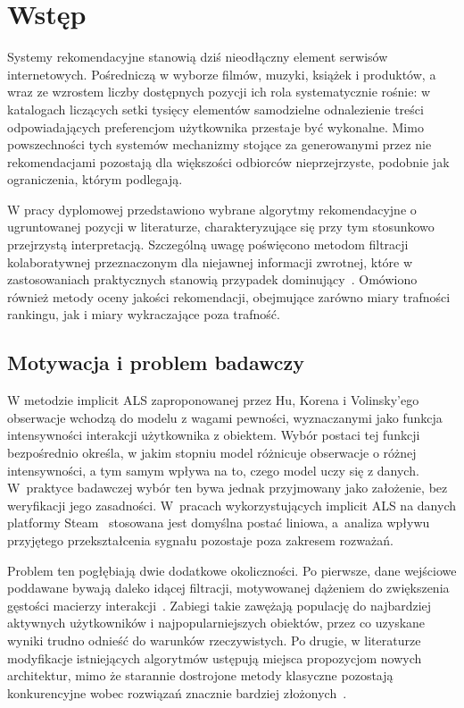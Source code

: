 \chapter{Wstęp}

Systemy rekomendacyjne stanowią dziś nieodłączny element serwisów internetowych. Pośredniczą w wyborze filmów, muzyki, książek i produktów, a wraz ze wzrostem liczby dostępnych pozycji ich rola systematycznie rośnie: w katalogach liczących setki tysięcy elementów samodzielne odnalezienie treści odpowiadających preferencjom użytkownika przestaje być wykonalne. Mimo powszechności tych systemów mechanizmy stojące za generowanymi przez nie rekomendacjami pozostają dla większości odbiorców nieprzejrzyste, podobnie jak ograniczenia, którym podlegają.

W pracy dyplomowej przedstawiono wybrane algorytmy rekomendacyjne o ugruntowanej pozycji w literaturze, charakteryzujące się przy tym stosunkowo przejrzystą interpretacją. Szczególną uwagę poświęcono metodom filtracji kolaboratywnej przeznaczonym dla niejawnej informacji zwrotnej, które w zastosowaniach praktycznych stanowią przypadek dominujący~\cite{aggarwal2016recommender}. Omówiono również metody oceny jakości rekomendacji, obejmujące zarówno miary trafności rankingu, jak i miary wykraczające poza trafność.

\section{Motywacja i problem badawczy}

W metodzie implicit ALS zaproponowanej przez Hu, Korena i Volinsky'ego~\cite{hu2008implicit} obserwacje wchodzą do modelu z wagami pewności, wyznaczanymi jako funkcja intensywności interakcji użytkownika z obiektem. Wybór postaci tej funkcji bezpośrednio określa, w jakim stopniu model różnicuje obserwacje o różnej intensywności, a tym samym wpływa na to, czego model uczy się z danych. W~praktyce badawczej wybór ten bywa jednak przyjmowany jako założenie, bez weryfikacji jego zasadności. W~pracach wykorzystujących implicit ALS na danych platformy Steam~\cite{cheuque2019steam,bayram2021game} stosowana jest domyślna postać liniowa, a~analiza wpływu przyjętego przekształcenia sygnału pozostaje poza zakresem rozważań.

Problem ten pogłębiają dwie dodatkowe okoliczności. Po pierwsze, dane wejściowe poddawane bywają daleko idącej filtracji, motywowanej dążeniem do zwiększenia gęstości macierzy interakcji~\cite{cheuque2019steam}. Zabiegi takie zawężają populację do najbardziej aktywnych użytkowników i najpopularniejszych obiektów, przez co uzyskane wyniki trudno odnieść do warunków rzeczywistych. Po drugie, w literaturze modyfikacje istniejących algorytmów ustępują miejsca propozycjom nowych architektur, mimo że starannie dostrojone metody klasyczne pozostają konkurencyjne wobec rozwiązań znacznie bardziej złożonych~\cite{dacrema2019progress,rendle2020neural}.

